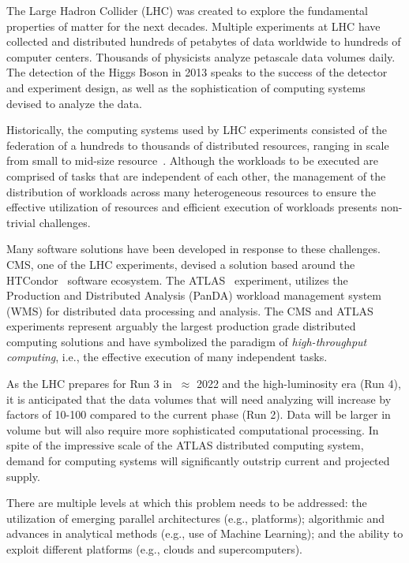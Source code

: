 The Large Hadron Collider (LHC) was created to explore the fundamental
properties of matter for the next decades.   Multiple experiments at LHC have
collected and distributed hundreds of petabytes of data worldwide to hundreds of
computer centers. Thousands of physicists analyze petascale data volumes daily.
The detection of the Higgs Boson in 2013 speaks to the success of the detector
and experiment design, as well as the sophistication of computing systems
devised to analyze the data.

Historically, the computing systems used by LHC experiments consisted of the
federation of a hundreds to thousands of distributed resources, %
ranging in scale from small to mid-size resource~\cite{foster2003grid}. Although
the workloads to be executed are comprised of tasks that are independent of each
other, the management of the distribution of workloads across many heterogeneous
resources to ensure the effective utilization of resources and efficient
execution of workloads presents non-trivial challenges.

Many software solutions have been developed in response to these challenges.
CMS, one of the LHC experiments, devised a solution based around the
HTCondor~\cite{thain2005distributed} software ecosystem. The
ATLAS~\cite{Aad:2008} experiment, utilizes the Production and Distributed
Analysis (PanDA) workload management system~\cite{Maeno2011} (WMS) for
distributed data processing and analysis. The CMS and ATLAS experiments
represent arguably the largest production grade distributed computing solutions
and have symbolized the paradigm of {\it high-throughput computing}, i.e., the
effective execution of many independent tasks.

As the LHC prepares for Run 3 in $~\approx$ 2022 and the high-luminosity era
(Run 4), it is anticipated that the data volumes that will need analyzing will
increase by factors of 10-100 compared to the current phase (Run 2). Data will
be larger in volume but will also require more sophisticated computational
processing. In spite of the impressive scale of the ATLAS distributed computing
system, demand for computing systems will significantly outstrip current and projected supply. %

There are multiple levels at which this problem needs to be addressed: the
utilization of emerging parallel architectures (e.g., platforms); algorithmic
and advances in analytical methods (e.g., use of Machine Learning); and the
ability to exploit different platforms (e.g., clouds and supercomputers).

